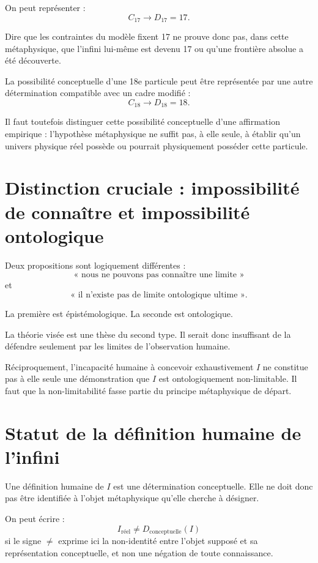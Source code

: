 \documentclass[11pt,a4paper]{article}
\begin{document}
On peut représenter :
\[
C_{17}\longrightarrow D_{17}=17.
\]

Dire que les contraintes du modèle fixent 17 ne prouve donc pas, dans cette
métaphysique, que l'infini lui-même est devenu 17 ou qu'une frontière absolue
a été découverte.

La possibilité conceptuelle d'une 18e particule peut être représentée par
une autre détermination compatible avec un cadre modifié :
\[
C_{18}\longrightarrow D_{18}=18.
\]

Il faut toutefois distinguer cette possibilité conceptuelle d'une affirmation
empirique : l'hypothèse métaphysique ne suffit pas, à elle seule, à établir
qu'un univers physique réel possède ou pourrait physiquement posséder cette
particule.

\section{Distinction cruciale : impossibilité de connaître et impossibilité ontologique}

Deux propositions sont logiquement différentes :
\[
\text{« nous ne pouvons pas connaître une limite »}
\]
et
\[
\text{« il n'existe pas de limite ontologique ultime ».}
\]

La première est épistémologique. La seconde est ontologique.

La théorie visée est une thèse du second type. Il serait donc insuffisant de
la défendre seulement par les limites de l'observation humaine.

Réciproquement, l'incapacité humaine à concevoir exhaustivement \(I\) ne
constitue pas à elle seule une démonstration que \(I\) est ontologiquement
non-limitable. Il faut que la non-limitabilité fasse partie du principe
métaphysique de départ.

\section{Statut de la définition humaine de l'infini}

Une définition humaine de \(I\) est une détermination conceptuelle. Elle ne
doit donc pas être identifiée à l'objet métaphysique qu'elle cherche à
désigner.

On peut écrire :
\[
I_{\mathrm{réel}}\neq D_{\mathrm{conceptuelle}}(I)
\]
si le signe \(\neq\) exprime ici la non-identité entre l'objet supposé et sa
représentation conceptuelle, et non une négation de toute connaissance.
\end{document}

